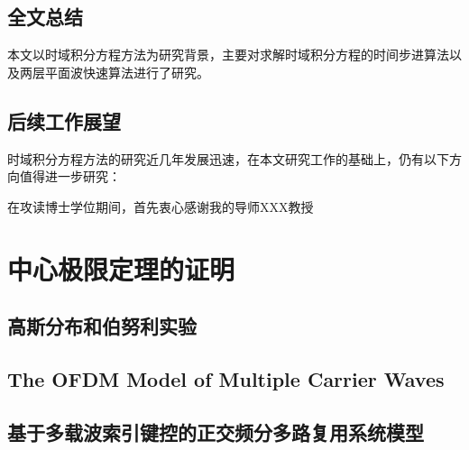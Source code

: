 \documentclass[promaster]{thesis-uestc}
\begin{document}
\section{全文总结}
本文以时域积分方程方法为研究背景，主要对求解时域积分方程的时间步进算法以及两层平面波快速算法进行了研究。

\section{后续工作展望}
时域积分方程方法的研究近几年发展迅速，在本文研究工作的基础上，仍有以下方向值得进一步研究：

\thesisacknowledgement
在攻读博士学位期间，首先衷心感谢我的导师XXX教授

\thesisappendix

\chapter{中心极限定理的证明}

\section{高斯分布和伯努利实验}




%
% 
%
% 
% 
%


\thesistranslationoriginal
\section{The OFDM Model of Multiple Carrier Waves}

\thesistranslationchinese
\section{基于多载波索引键控的正交频分多路复用系统模型}
\end{document}
